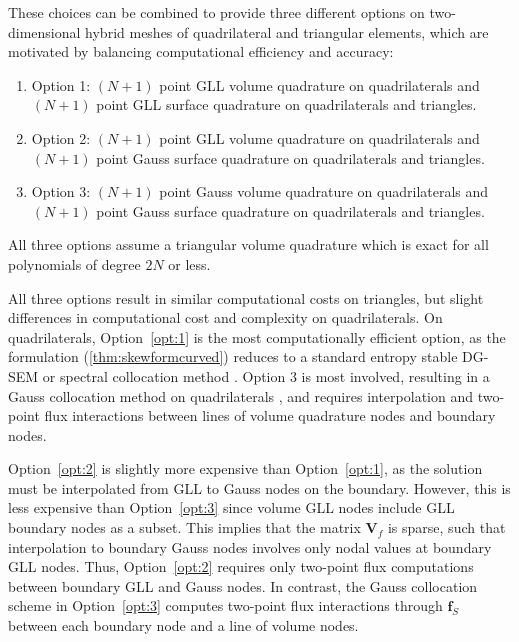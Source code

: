 \documentclass{svjour3}                     %
\begin{document}
These choices can be combined to provide three different options on two-dimensional hybrid meshes of quadrilateral and triangular elements, which are motivated by balancing computational efficiency and accuracy:
\begin{enumerate}
\item Option 1: $(N+1)$ point GLL volume quadrature on quadrilaterals and $(N+1)$ point GLL surface quadrature on quadrilaterals and triangles.\label{opt:1}
\item Option 2: $(N+1)$ point GLL volume quadrature on quadrilaterals and $(N+1)$ point Gauss surface quadrature on quadrilaterals and triangles.\label{opt:2}
\item Option 3: $(N+1)$ point Gauss volume quadrature on quadrilaterals and $(N+1)$ point Gauss surface quadrature on quadrilaterals and triangles.\label{opt:3}
\end{enumerate}
All three options assume a triangular volume quadrature which is exact for all polynomials of degree $2N$ or less.  

All three options result in similar computational costs on triangles, but slight differences in computational cost and complexity on quadrilaterals.  On quadrilaterals, Option~\ref{opt:1} is the most computationally efficient option, as the formulation (\ref{thm:skewformcurved}) reduces to a standard entropy stable DG-SEM \cite{gassner2016split} or spectral collocation method \cite{carpenter2014entropy}.  Option 3 is most involved, resulting in a Gauss collocation method on quadrilaterals \cite{chan2018efficient}, and requires interpolation and two-point flux interactions between lines of volume quadrature nodes and boundary nodes.  %

Option~\ref{opt:2} is slightly more expensive than Option~\ref{opt:1}, as the solution must be interpolated from GLL to Gauss nodes on the boundary.  However, this is less expensive than Option~\ref{opt:3} since volume GLL nodes include GLL boundary nodes as a subset.  This implies that the matrix $\bm{V}_f$ is sparse, such that interpolation to boundary Gauss nodes involves only nodal values at boundary GLL nodes.  Thus, Option~\ref{opt:2} requires only two-point flux computations between boundary GLL and Gauss nodes.  In contrast, the Gauss collocation scheme in Option~\ref{opt:3} computes two-point flux interactions through $\bm{f}_S$ between each boundary node and a line of volume nodes.  
\end{document}
